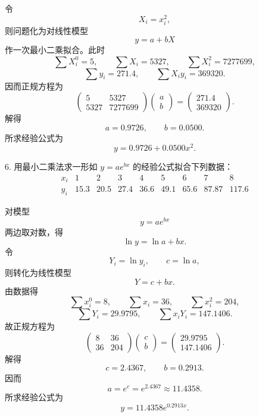 \documentclass[11pt, a4paper]{ctexart}
\begin{document}
\begin{solution}
    令
    \[
        X_i=x_i^2,
    \]
    则问题化为对线性模型
    \[
        y=a+bX
    \]
    作一次最小二乘拟合。此时
    \[
        \sum X_i^0=5,\qquad \sum X_i=5327,\qquad \sum X_i^2=7277699,
    \]
    \[
        \sum y_i=271.4,\qquad \sum X_iy_i=369320.
    \]
    因而正规方程为
    \[
        \begin{pmatrix}
            5 & 5327 \\
            5327 & 7277699
        \end{pmatrix}
        \begin{pmatrix}
            a \\
            b
        \end{pmatrix}
        =
        \begin{pmatrix}
            271.4 \\
            369320
        \end{pmatrix}.
    \]
    解得
    \[
        a=0.9726,\qquad b=0.0500.
    \]
    所求经验公式为
    \[
        y=0.9726+0.0500x^2.
    \]
\end{solution}


\begin{problem}{6. 用最小二乘法求一形如 $y=ae^{bx}$ 的经验公式拟合下列数据：}
    \[
        \begin{array}{c|cccccccc}
            x_i & 1 & 2 & 3 & 4 & 5 & 6 & 7 & 8 \\ \hline
            y_i & 15.3 & 20.5 & 27.4 & 36.6 & 49.1 & 65.6 & 87.87 & 117.6
        \end{array}
    \]
\end{problem}

\begin{solution}
    对模型
    \[
        y=ae^{bx}
    \]
    两边取对数，得
    \[
        \ln y=\ln a+bx.
    \]
    令
    \[
        Y_i=\ln y_i,\qquad c=\ln a,
    \]
    则转化为线性模型
    \[
        Y=c+bx.
    \]
    由数据得
    \[
        \sum x_i^0=8,\qquad \sum x_i=36,\qquad \sum x_i^2=204,
    \]
    \[
        \sum Y_i=29.9795,\qquad \sum x_iY_i=147.1406.
    \]
    故正规方程为
    \[
        \begin{pmatrix}
            8 & 36 \\
            36 & 204
        \end{pmatrix}
        \begin{pmatrix}
            c \\
            b
        \end{pmatrix}
        =
        \begin{pmatrix}
            29.9795 \\
            147.1406
        \end{pmatrix}.
    \]
    解得
    \[
        c=2.4367,\qquad b=0.2913.
    \]
    因而
    \[
        a=e^c=e^{2.4367}\approx 11.4358.
    \]
    所求经验公式为
    \[
        y=11.4358e^{0.2913x}.
    \]
\end{solution}
\end{document}
